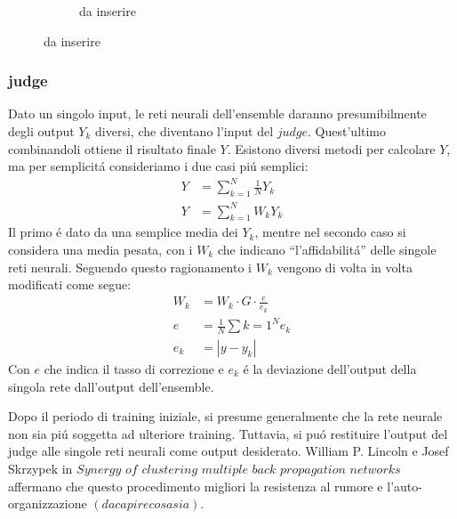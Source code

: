 \documentclass[a4paper,10pt]{article}
\begin{document}
\begin{figure}[h!]
\begin{subfigure}[b]{0.4\linewidth}
   \caption{da inserire}
   \label{ClusterErrorbpgn}
  \end{subfigure}
 \end{figure}
 
 \subsubsection{judge}
 
 Dato un singolo input, le reti neurali dell'ensemble daranno presumibilmente degli output $Y_k$ diversi, che diventano l'input del $judge$. Quest'ultimo combinandoli ottiene il risultato finale $Y$. Esistono diversi metodi per calcolare $Y$, ma per semplicit\'a consideriamo i due casi pi\'u semplici:
 \begin{align}
  Y &= \sum_{k=1}^N \frac{1}{N} Y_k \\
  Y &= \sum_{k=1}^N W_k Y_k
 \end{align}
 Il primo \'e dato da una semplice media dei $Y_k$, mentre nel secondo caso si considera una media pesata, con i $W_k$ che indicano ``l'affidabilit\'a'' delle singole reti neurali. Seguendo questo ragionamento i $W_k$ vengono di volta in volta modificati come segue:
 \begin{align}
  W_k &= W_k \cdot G \cdot \frac{e}{e_k} \label{JudgeWeights} \\
  e &= \frac{1}{N} \sum{k=1}^N e_k \\
  e_k &= \left | y - y_k \right |
 \end{align}
 Con $e$ che indica il tasso di correzione e $e_k$ \'e la deviazione dell'output della singola rete dall'output dell'ensemble.
 
 Dopo il periodo di training iniziale, si presume generalmente che la rete neurale non sia pi\'u soggetta ad ulteriore training. Tuttavia, si pu\'o restituire l'output del judge alle singole reti neurali come output desiderato. William P. Lincoln e Josef Skrzypek in $Synergy$ $of$ $clustering$ $multiple$ $back$ $propagation$ $networks$ affermano che questo procedimento migliori la resistenza al rumore e l'auto-organizzazione $(da capire cosa sia)$.
  
\end{document}
